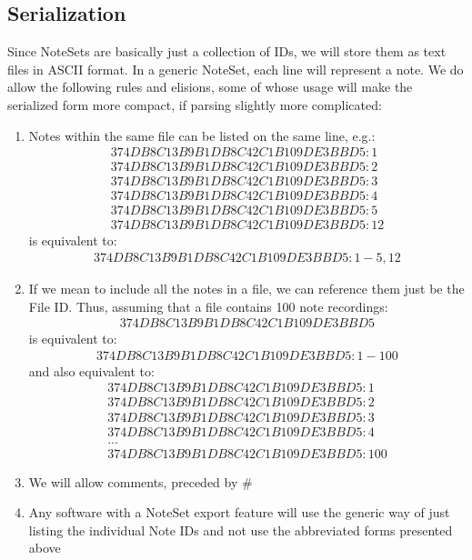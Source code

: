 \subsection{Serialization}
\label{subsection:ns_serialization}
Since NoteSets are basically just a collection of IDs, we will store them as text files in ASCII format. In a generic NoteSet, each line will represent a note. We do allow the following rules and elisions, some of whose usage will make the serialized form more compact, if parsing slightly more complicated:
\begin{enumerate}
\item Notes within the same file can be listed on the same line, e.g.:
\begin{align*}
374DB8C13B9B1DB8C42C1B109DE3BBD5:1 \\
374DB8C13B9B1DB8C42C1B109DE3BBD5:2 \\
374DB8C13B9B1DB8C42C1B109DE3BBD5:3 \\
374DB8C13B9B1DB8C42C1B109DE3BBD5:4 \\
374DB8C13B9B1DB8C42C1B109DE3BBD5:5 \\
374DB8C13B9B1DB8C42C1B109DE3BBD5:12
\end{align*}
is equivalent to:
\begin{align*}
374DB8C13B9B1DB8C42C1B109DE3BBD5:1-5,12
\end{align*}
\item If we mean to include all the notes in a file, we can reference them just be the File ID. Thus, assuming that a file contains 100 note recordings:
\begin{align*}
374DB8C13B9B1DB8C42C1B109DE3BBD5
\end{align*}
is equivalent to:
\begin{align*}
374DB8C13B9B1DB8C42C1B109DE3BBD5:1-100
\end{align*}
and also equivalent to:
\begin{align*}
374DB8C13B9B1DB8C42C1B109DE3BBD5:1 \\
374DB8C13B9B1DB8C42C1B109DE3BBD5:2 \\
374DB8C13B9B1DB8C42C1B109DE3BBD5:3 \\
374DB8C13B9B1DB8C42C1B109DE3BBD5:4 \\
...\\
374DB8C13B9B1DB8C42C1B109DE3BBD5:100
\end{align*}
\item We will allow comments, preceded by \#
\item Any software with a NoteSet export feature will use the generic way of just listing the individual Note IDs and not use the abbreviated forms presented above
\end{enumerate}

